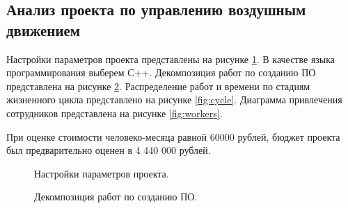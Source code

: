 \documentclass[a4paper,14pt]{article}
\begin{document}
\newpage
\subsection*{Анализ проекта по управлению воздушным движением}

Настройки параметров проекта представлены на рисунке \ref{fig:settings}. В качестве языка программирования выберем С++. Декомпозиция работ по созданию ПО представлена на рисунке \ref{fig:decompos}. Распределение работ и времени по стадиям жизненного цикла представлено на рисунке \ref{fig:cycle}. Диаграмма привлечения сотрудников представлена на рисунке \ref{fig:workers}. 

При оценке стоимости человеко-месяца равной 60000 рублей, бюджет проекта был предварительно оценен в 4 440 000 рублей.


\begin{figure}[!h]
    \caption{Настройки параметров проекта.}
    \label{fig:settings}
\end{figure}

\newpage
\begin{figure}[!h]
     \caption{Декомпозиция работ по созданию ПО.}
     \label{fig:decompos}
 \end{figure}
\end{document}
